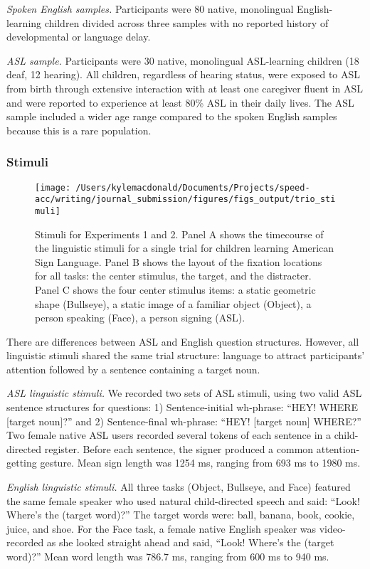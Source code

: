 \documentclass[oneside]{report}
\begin{document}
\emph{Spoken English samples.} Participants were 80 native, monolingual
English-learning children divided across three samples with no reported
history of developmental or language delay.

\emph{ASL sample.} Participants were 30 native, monolingual ASL-learning
children (18 deaf, 12 hearing). All children, regardless of hearing
status, were exposed to ASL from birth through extensive interaction
with at least one caregiver fluent in ASL and were reported to
experience at least 80\% ASL in their daily lives. The ASL sample
included a wider age range compared to the spoken English samples
because this is a rare population.

\subsubsection{Stimuli}\label{stimuli-1}
\begin{figure}[t]

{\centering \texttt{[image: /Users/kylemacdonald/Documents/Projects/speed-acc/writing/journal\_submission/figures/figs\_output/trio\_stimuli]} 

}

\caption{Stimuli for Experiments 1 and 2. Panel A shows the timecourse of the linguistic stimuli for a single trial for children learning American Sign Language. Panel B shows the layout of the fixation locations for all tasks: the center stimulus, the target, and the distracter. Panel C shows the four center stimulus items: a static geometric shape (Bullseye), a static image of a familiar object (Object), a person speaking (Face), a person signing (ASL).}\label{fig:trio-stim}
\end{figure}
There are differences between ASL and English question structures.
However, all linguistic stimuli shared the same trial structure:
language to attract participants' attention followed by a sentence
containing a target noun.

\emph{ASL linguistic stimuli.} We recorded two sets of ASL stimuli,
using two valid ASL sentence structures for questions: 1)
Sentence-initial wh-phrase: ``HEY! WHERE {[}target noun{]}?'' and 2)
Sentence-final wh-phrase: ``HEY! {[}target noun{]} WHERE?'' Two female
native ASL users recorded several tokens of each sentence in a
child-directed register. Before each sentence, the signer produced a
common attention-getting gesture. Mean sign length was 1254 ms, ranging
from 693 ms to 1980 ms.

\emph{English linguistic stimuli.} All three tasks (Object, Bullseye,
and Face) featured the same female speaker who used natural
child-directed speech and said: ``Look! Where's the (target word)?'' The
target words were: ball, banana, book, cookie, juice, and shoe. For the
Face task, a female native English speaker was video-recorded as she
looked straight ahead and said, ``Look! Where's the (target word)?''
Mean word length was 786.7 ms, ranging from 600 ms to 940 ms.
\end{document}
